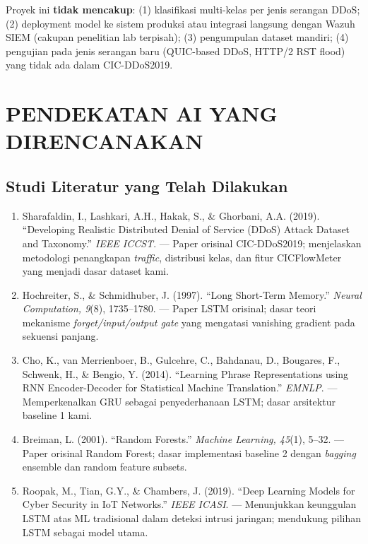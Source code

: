 \documentclass[11pt,a4paper,oneside]{report}
\begin{document}
Proyek ini \textbf{tidak mencakup}: (1) klasifikasi multi-kelas per jenis serangan DDoS; (2) deployment model ke sistem produksi atau integrasi langsung dengan Wazuh SIEM (cakupan penelitian lab terpisah); (3) pengumpulan dataset mandiri; (4) pengujian pada jenis serangan baru (QUIC-based DDoS, HTTP/2 RST flood) yang tidak ada dalam CIC-DDoS2019.

\chapter{PENDEKATAN AI YANG DIRENCANAKAN}
\label{bab:pendekatan}

\section{Studi Literatur yang Telah Dilakukan}

\begin{enumerate}[leftmargin=*]
    \item Sharafaldin, I., Lashkari, A.H., Hakak, S., \& Ghorbani, A.A. (2019). ``Developing Realistic Distributed Denial of Service (DDoS) Attack Dataset and Taxonomy.'' \textit{IEEE ICCST}. --- Paper orisinal CIC-DDoS2019; menjelaskan metodologi penangkapan \textit{traffic}, distribusi kelas, dan fitur CICFlowMeter yang menjadi dasar dataset kami.

    \item Hochreiter, S., \& Schmidhuber, J. (1997). ``Long Short-Term Memory.'' \textit{Neural Computation, 9}(8), 1735--1780. --- Paper LSTM orisinal; dasar teori mekanisme \textit{forget/input/output gate} yang mengatasi vanishing gradient pada sekuensi panjang.

    \item Cho, K., van Merrienboer, B., Gulcehre, C., Bahdanau, D., Bougares, F., Schwenk, H., \& Bengio, Y. (2014). ``Learning Phrase Representations using RNN Encoder-Decoder for Statistical Machine Translation.'' \textit{EMNLP}. --- Memperkenalkan GRU sebagai penyederhanaan LSTM; dasar arsitektur baseline 1 kami.

    \item Breiman, L. (2001). ``Random Forests.'' \textit{Machine Learning, 45}(1), 5--32. --- Paper orisinal Random Forest; dasar implementasi baseline 2 dengan \textit{bagging} ensemble dan random feature subsets.

    \item Roopak, M., Tian, G.Y., \& Chambers, J. (2019). ``Deep Learning Models for Cyber Security in IoT Networks.'' \textit{IEEE ICASI}. --- Menunjukkan keunggulan LSTM atas ML tradisional dalam deteksi intrusi jaringan; mendukung pilihan LSTM sebagai model utama.
\end{enumerate}
\end{document}

